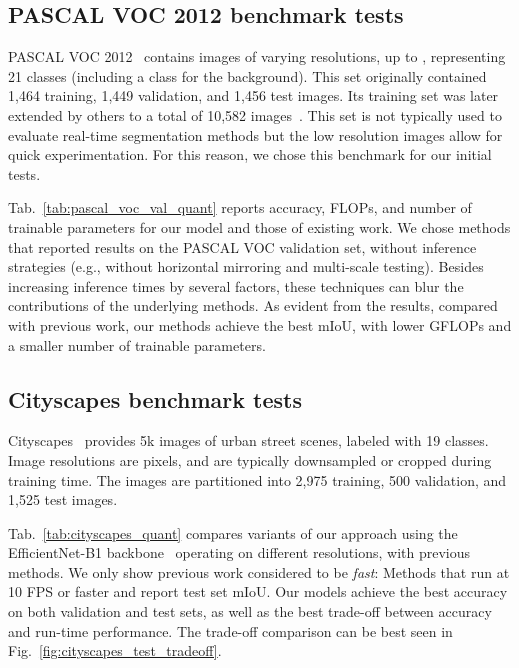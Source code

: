 \documentclass[final]{cvpr}
\begin{document}
\subsection{PASCAL VOC 2012 benchmark tests}
\label{subsec:PASCAL VOC 2012 dataset}
PASCAL VOC 2012~\cite{everingham2010pascal} contains images of varying resolutions, up to , representing 21 classes (including a class for the background). This set originally contained 1,464 training, 1,449 validation, and 1,456 test images. Its training set was later extended by others to a total of 10,582 images~\cite{hariharan2011semantic}. This set is not typically used to evaluate real-time segmentation methods but the low resolution images allow for quick experimentation. For this reason, we chose this benchmark for our initial tests.

Tab.~\ref{tab:pascal_voc_val_quant} reports accuracy, FLOPs, and number of trainable parameters for our model and those of existing work. We chose methods that reported results on the PASCAL VOC validation set, without inference strategies (e.g., without horizontal mirroring and multi-scale testing). Besides increasing inference times by several factors, these techniques can blur the contributions of the underlying methods. As evident from the results, compared with previous work, our methods achieve the best mIoU, with lower GFLOPs and a smaller number of trainable parameters.


\subsection{Cityscapes benchmark tests}
\label{subsec:Cityscapes dataset}
Cityscapes~\cite{cordts2016cityscapes} provides 5k images of urban street scenes, labeled with 19 classes. Image resolutions are  pixels, and are typically downsampled or cropped during training time. The images are partitioned into 2,975 training, 500 validation, and 1,525 test images.

Tab.~\ref{tab:cityscapes_quant} compares variants of our approach using the EfficientNet-B1 backbone~\cite{tan2019efficientnet} operating on different resolutions, with previous methods. We only show previous work considered to be {\em fast}: Methods that run at 10 FPS or faster and report test set mIoU. Our models achieve the best accuracy on both validation and test sets, as well as the best trade-off between accuracy and run-time performance. The trade-off comparison can be best seen in Fig.~\ref{fig:cityscapes_test_tradeoff}.
\end{document}
